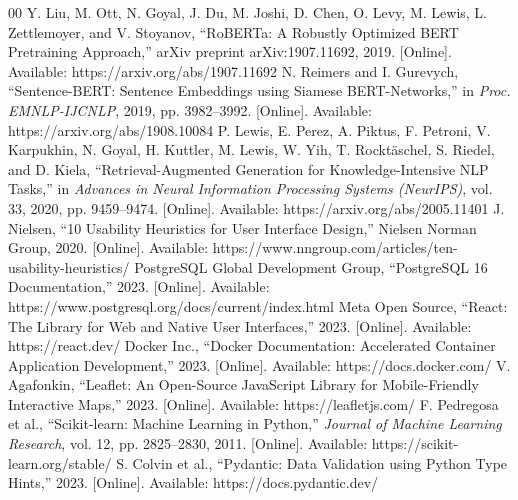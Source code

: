 ﻿\documentclass[conference]{IEEEtran}
\begin{document}
\begin{thebibliography}{00}
 Y. Liu, M. Ott, N. Goyal, J. Du, M. Joshi, D. Chen, O. Levy, M. Lewis, L. Zettlemoyer, and V. Stoyanov, ``RoBERTa: A Robustly Optimized BERT Pretraining Approach,'' arXiv preprint arXiv:1907.11692, 2019. [Online]. Available: https://arxiv.org/abs/1907.11692
 N. Reimers and I. Gurevych, ``Sentence-BERT: Sentence Embeddings using Siamese BERT-Networks,'' in \textit{Proc. EMNLP-IJCNLP}, 2019, pp. 3982--3992. [Online]. Available: https://arxiv.org/abs/1908.10084
 P. Lewis, E. Perez, A. Piktus, F. Petroni, V. Karpukhin, N. Goyal, H. Kuttler, M. Lewis, W. Yih, T. Rockt\"{a}schel, S. Riedel, and D. Kiela, ``Retrieval-Augmented Generation for Knowledge-Intensive NLP Tasks,'' in \textit{Advances in Neural Information Processing Systems (NeurIPS)}, vol. 33, 2020, pp. 9459--9474. [Online]. Available: https://arxiv.org/abs/2005.11401
 J. Nielsen, ``10 Usability Heuristics for User Interface Design,'' Nielsen Norman Group, 2020. [Online]. Available: https://www.nngroup.com/articles/ten-usability-heuristics/
 PostgreSQL Global Development Group, ``PostgreSQL 16 Documentation,'' 2023. [Online]. Available: https://www.postgresql.org/docs/current/index.html
 Meta Open Source, ``React: The Library for Web and Native User Interfaces,'' 2023. [Online]. Available: https://react.dev/
 Docker Inc., ``Docker Documentation: Accelerated Container Application Development,'' 2023. [Online]. Available: https://docs.docker.com/
 V. Agafonkin, ``Leaflet: An Open-Source JavaScript Library for Mobile-Friendly Interactive Maps,'' 2023. [Online]. Available: https://leafletjs.com/
 F. Pedregosa et al., ``Scikit-learn: Machine Learning in Python,'' \textit{Journal of Machine Learning Research}, vol. 12, pp. 2825--2830, 2011. [Online]. Available: https://scikit-learn.org/stable/
 S. Colvin et al., ``Pydantic: Data Validation using Python Type Hints,'' 2023. [Online]. Available: https://docs.pydantic.dev/
\end{thebibliography}
\end{document}
